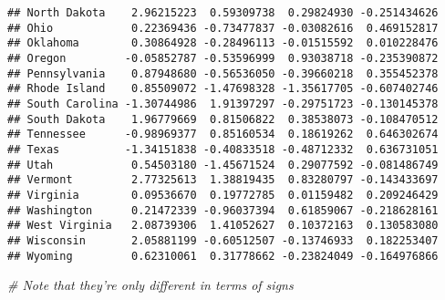 \documentclass[]{article}
\newenvironment{Shaded}{\begin{snugshade}}{\end{snugshade}}
\newcommand{\CommentTok}[1]{\textcolor[rgb]{0.56,0.35,0.01}{\textit{#1}}}
\begin{document}
\begin{verbatim}
## North Dakota    2.96215223  0.59309738  0.29824930 -0.251434626
## Ohio            0.22369436 -0.73477837 -0.03082616  0.469152817
## Oklahoma        0.30864928 -0.28496113 -0.01515592  0.010228476
## Oregon         -0.05852787 -0.53596999  0.93038718 -0.235390872
## Pennsylvania    0.87948680 -0.56536050 -0.39660218  0.355452378
## Rhode Island    0.85509072 -1.47698328 -1.35617705 -0.607402746
## South Carolina -1.30744986  1.91397297 -0.29751723 -0.130145378
## South Dakota    1.96779669  0.81506822  0.38538073 -0.108470512
## Tennessee      -0.98969377  0.85160534  0.18619262  0.646302674
## Texas          -1.34151838 -0.40833518 -0.48712332  0.636731051
## Utah            0.54503180 -1.45671524  0.29077592 -0.081486749
## Vermont         2.77325613  1.38819435  0.83280797 -0.143433697
## Virginia        0.09536670  0.19772785  0.01159482  0.209246429
## Washington      0.21472339 -0.96037394  0.61859067 -0.218628161
## West Virginia   2.08739306  1.41052627  0.10372163  0.130583080
## Wisconsin       2.05881199 -0.60512507 -0.13746933  0.182253407
## Wyoming         0.62310061  0.31778662 -0.23824049 -0.164976866
\end{verbatim}

\begin{Shaded}
\begin{Highlighting}[]
\CommentTok{# Note that they're only different in terms of signs}
\end{Highlighting}
\end{Shaded}
\end{document}
